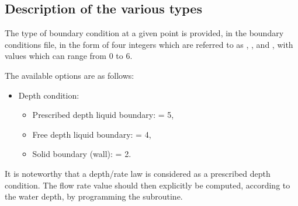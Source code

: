 \subsection{Description of the various types}
\label{sec:descr_bnd}

The type of boundary condition at a given point is provided, in the boundary
conditions file, in the form of four integers which are referred to as
, ,  and ,
with values which can range from 0 to 6.

The available options are as follows:

\begin{itemize}
\item Depth condition:

\begin{itemize}
\item Prescribed depth liquid boundary:  = 5,

\item Free depth liquid boundary:  = 4,

\item Solid boundary (wall):  = 2.
\end{itemize}
\end{itemize}

It is noteworthy that a depth/rate law is considered as a prescribed depth
condition. The flow rate value should then explicitly be computed, according to
the water depth, by programming the  subroutine.

